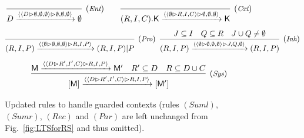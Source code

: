 \documentclass[sn-mathphys-num,a4paper,iicol,lineno,pdflatex]{sn-jnl-hacked}
\newcommand{\obs}[2]{\langle #1\vartriangleright #2\rangle}
\theoremstyle{thmstyleone}%
\theoremstyle{thmstyletwo}%
\theoremstyle{thmstylethree}%
\begin{document}
\begin{figure}[t]
	{\footnotesize
		$$  
		\infer[(\textit{\scriptsize{Ent}})]
		{D \xrightarrow{\obs{\obs{D}{\emptyset,\emptyset,\emptyset}}{\emptyset,\emptyset,\emptyset}}\emptyset}
		{}
		\qquad
		\infer[(\textit{\scriptsize{Cxt}})]
		{(R,I,C).\mathsf{K} \xrightarrow{\obs{\obs{\emptyset}{R,I,C}}{\emptyset,\emptyset,\emptyset}}\mathsf{K}}{}
		$$
		$$
		\infer[(\textit{\scriptsize Pro})]
		{(R,I,P)  \xrightarrow{\obs{\obs{\emptyset}{\emptyset,\emptyset,\emptyset}}{R,I,P}}(R,I,P)|P}
		{}
		\;\;
		\infer[(\textit{\scriptsize Inh})]
		{(R,I,P)  \xrightarrow{\obs{\obs{\emptyset}{\emptyset,\emptyset,\emptyset}}{J,Q,\emptyset}}(R,I,P)}
		{J \subseteq I & Q \subseteq R & J\cup Q\neq \emptyset}
		$$
		$$
		\infer[(\textit{\scriptsize Sys})]
		{[\mathsf{M}]\xrightarrow{\obs{\obs{D}{R',I',C}}{R,I,P}} [\mathsf{M}']}
		{\mathsf{M}\xrightarrow{\obs{\obs{D}{R',I',C}}{R,I,P}} \mathsf{M}' &
		R'\subseteq D &
        R\subseteq D\cup C}
		$$
	}
		\caption{Updated rules to handle guarded contexts (rules $(\textit{Suml})$, $(\textit{Sumr})$, $(\textit{Rec})$ and $(\textit{Par})$ are left unchanged from Fig.~\ref{fig:LTSforRS} and thus omitted).}
		\label{fig:guardforRS2nd}
\end{figure}
\end{document}

